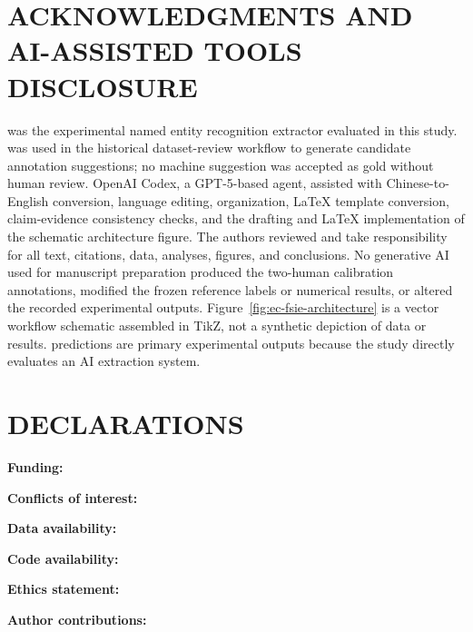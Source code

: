 \section*{ACKNOWLEDGMENTS AND AI-ASSISTED TOOLS DISCLOSURE}


 was the experimental named entity recognition
extractor evaluated in this study.  was
used in the historical dataset-review workflow to generate candidate
annotation suggestions; no machine suggestion was accepted as gold without
human review. OpenAI Codex, a GPT-5-based agent, assisted with
Chinese-to-English conversion, language editing, organization, LaTeX template
conversion, claim-evidence consistency checks, and the drafting and LaTeX
implementation of the schematic architecture figure. The authors reviewed and
take responsibility for all text, citations, data, analyses, figures, and
conclusions. No generative AI used for manuscript preparation produced the
two-human calibration annotations, modified the frozen reference labels or
numerical results, or altered the recorded experimental outputs.
Figure~\ref{fig:ec-fsie-architecture} is a vector workflow schematic assembled
in TikZ, not a synthetic depiction of data or results.
 predictions are primary experimental outputs
because the study directly evaluates an AI extraction system.

\section*{DECLARATIONS}

\noindent\textbf{Funding:} 

\noindent\textbf{Conflicts of interest:}

\noindent\textbf{Data availability:}

\noindent\textbf{Code availability:}

\noindent\textbf{Ethics statement:}

\noindent\textbf{Author contributions:}

